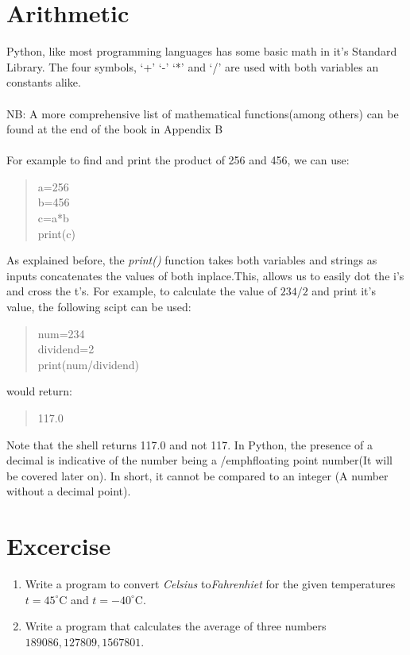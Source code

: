 \section{Arithmetic}
Python, like most programming languages has some basic math in it's Standard Library. The four symbols, `+' `-' `*' and `/' are used with both variables an constants alike.
\\ \\ NB: A more comprehensive list of mathematical functions(among others) can be found at the end of the book in Appendix B\\ \\
 For example to find and print the product of 256 and 456, we can use:
\begin{quote}
a=256\\b=456\\c=a*b\\print(c)
\end{quote}
As explained before, the  \emph{print()} function takes both variables and strings as inputs concatenates the values of both inplace.This, allows us to easily dot the i's and cross the t's. For example, to calculate the value of $234/2$ and print it's value, the following scipt can be used:

\begin{quote}
num=234\\
dividend=2\\
print(num/dividend)
\end{quote}
would return:
\begin{quote}
117.0
\end{quote}

Note that the shell returns 117.0 and not 117. In Python, the presence of a decimal is indicative of the number being a /emph{floating point} number(It will be covered later on). In short, it cannot be compared to an integer (A number without a decimal point).
\newpage	
\section{Excercise}
\begin{enumerate}
\item Write a program to convert \emph{Celsius} to\emph{Fahrenhiet} for the given temperatures $t=45^{\circ}$C and $t=-40^{\circ}$C.
\item Write a program that calculates the average of three numbers $189086,127809,1567801$.
\end{enumerate}

